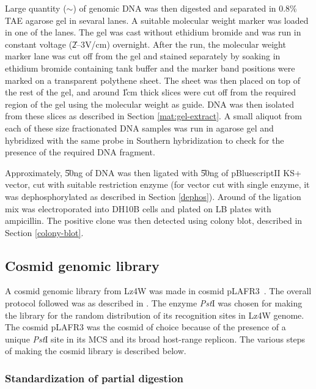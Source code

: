 Large quantity ($\sim$) of genomic DNA was then digested
and separated in 0.8\% TAE agarose gel in sevaral lanes. A
suitable molecular weight marker was loaded in one of the lanes.
The gel was cast without ethidium bromide and was run in constant
voltage (\U{2--3}{V/cm}) overnight. After the run, the molecular
weight marker lane was cut off from the gel and stained separately
by soaking in ethidium bromide containing tank buffer and the
marker band positions were marked on a transparent polythene
sheet. The sheet was then placed on top of the rest of the gel,
and around \U{1}{cm} thick slices were cut off from the required
region of the gel using the molecular weight as guide. DNA was
then isolated from these slices as described in Section
\ref{mat:gel-extract}. A small aliquot from each of these size
fractionated DNA samples was run in agarose gel and hybridized
with the same probe in Southern hybridization to check for the
presence of the required DNA fragment.

Approximately, \U{50}{ng} of DNA was then ligated with \U{50}{ng}
of pBluescriptII KS+ vector, cut with suitable restriction enzyme
(for vector cut with single enzyme, it was dephosphorylated as
described in Section \ref{dephos}). Around  of the
ligation mix was electroporated into  DH10B cells and
plated on LB plates with ampicillin. The positive clone was then
detected using colony blot, described in Section
\ref{colony-blot}.

\subsection{Cosmid genomic library}
\label{chap2:cosmid_library}

A cosmid genomic library from Lz4W was made in cosmid
pLAFR3~\citep{Staskawicz1987}. The overall protocol followed was
as described in \citet{Asubel1991}. The enzyme \emph{Pst}I was
chosen for making the library for the random distribution of its
recognition sites in Lz4W genome. The cosmid pLAFR3 was the cosmid
of choice because of the presence of a unique \emph{Pst}I site in
its MCS and its broad host-range replicon. The various steps of
making the cosmid library is described below.

\subsubsection{Standardization of partial digestion}

